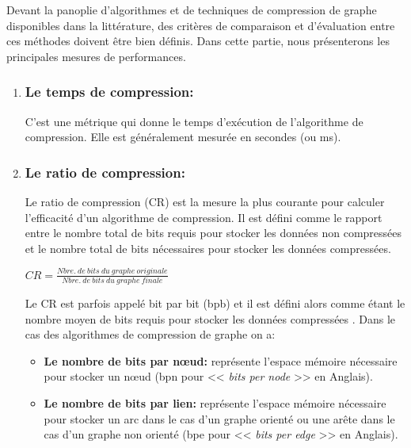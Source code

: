 	
				Devant la panoplie d'algorithmes et de techniques de compression de graphe disponibles dans la littérature, des critères de comparaison  et d'évaluation entre ces méthodes doivent être bien définis. Dans cette partie, nous présenterons les principales mesures de performances.
				
				\begin{enumerate}[label=\alph*)]
					\item \subsubsection{Le temps de compression:}
				C'est une métrique qui donne le temps d'exécution de l'algorithme de compression. Elle est généralement mesurée en secondes (ou ms).
				
				\item 	\subsubsection{Le ratio de compression:}
				Le ratio de compression (CR) est la mesure la plus courante pour calculer l'efficacité d'un algorithme de compression. Il est défini comme le rapport entre le nombre total de bits requis pour stocker les données non compressées et le nombre total de bits nécessaires pour stocker les données compressées.
				\begin{center}
				$
				CR = \frac{Nbre.\ de\ bits\ du\ graphe\ originale}{Nbre.\ de\ bits\ du\ graphe\ finale }
				$
				\end{center}
				
				
				Le CR est parfois appelé bit par bit (bpb) et il est défini alors comme étant le nombre moyen de bits requis pour stocker les données compressées \citep{uthayakumar2018survey}. Dans le cas des algorithmes de compression de graphe on a:
				\begin{itemize}
					\item \textbf{Le nombre de bits par nœud:}
					représente l'espace mémoire nécessaire pour stocker un nœud (bpn pour << \textit{bits per node} >> en Anglais).
					
					\item \textbf{Le nombre de bits par lien:}
					représente l'espace mémoire nécessaire pour stocker un arc dans le cas d'un graphe orienté ou une arête dans le cas d'un graphe non orienté (bpe pour << \textit{bits per edge} >> en Anglais).
				\end{itemize}
				

\end{enumerate}
